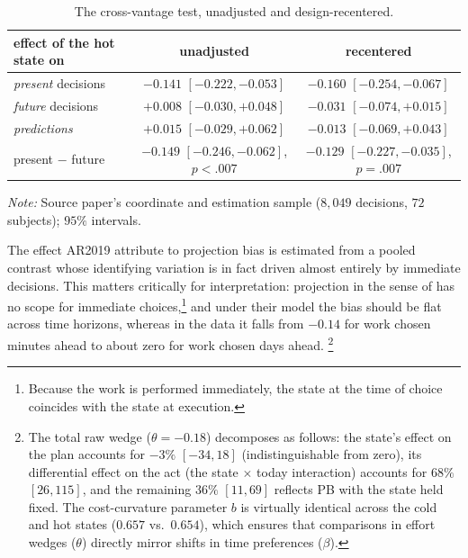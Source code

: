 \documentclass[11pt,a4paper]{article}
\theoremstyle{plain}
\theoremstyle{definition}
\begin{document}
\begin{table}[H]\centering
\caption{The cross-vantage test, unadjusted and design-recentered.}
\label{tab:vant}
\begin{threeparttable}
{\footnotesize
\renewcommand{\arraystretch}{1.12}%
\setlength{\tabcolsep}{10pt}%
\begin{tabular}{lcc}
\toprule
effect of the hot state on & unadjusted & recentered \\
\midrule
\emph{present} decisions & $-0.141$ $[-0.222,-0.053]$ & $\mathbf{-0.160}$ $[-0.254,-0.067]$ \\
\emph{future} decisions & $+0.008$ $[-0.030,+0.048]$ & $-0.031$ $[-0.074,+0.015]$ \\
\emph{predictions} & $+0.015$ $[-0.029,+0.062]$ & $-0.013$ $[-0.069,+0.043]$ \\
present $-$ future & $-0.149$ $[-0.246,-0.062]$, $p<.007$ & $\mathbf{-0.129}$ $[-0.227,-0.035]$, $p=.007$ \\
\bottomrule
\end{tabular}}

\begin{tablenotes}[flushleft]
\footnotesize
\item \textit{Note:}  Source paper's coordinate and estimation sample ($8{,}049$ decisions, $72$ subjects); $95\%$ intervals.
\end{tablenotes}
\end{threeparttable}
\end{table}

\noindent
The effect AR2019 attribute to projection bias is estimated from a pooled contrast whose identifying variation is in fact driven almost entirely by immediate decisions.
This matters critically for interpretation: projection in the sense of \citet{lor2003} has no scope for immediate choices,\footnote{%
Because the work is performed immediately, the state at the time of choice coincides with the state at execution.} 
and under their model the bias should be flat across time horizons, whereas in the data it falls from $-0.14$ for work chosen minutes ahead to about zero for work chosen days ahead.
\footnote{%
The total raw wedge ($\theta = -0.18$) decomposes as follows: the state's effect on the plan accounts for $-3\%$ $[-34, 18]$ (indistinguishable from zero), its differential effect on the act (the state $\times$ today interaction) accounts for $68\%$ $[26, 115]$, and the remaining $36\%$ $[11, 69]$ reflects PB with the state held fixed. The cost-curvature parameter $b$ is virtually identical across the cold and hot states ($0.657$ vs.\ $0.654$), %
which ensures that comparisons in effort wedges ($\theta$) directly mirror shifts in time preferences ($\beta$).}
\end{document}
